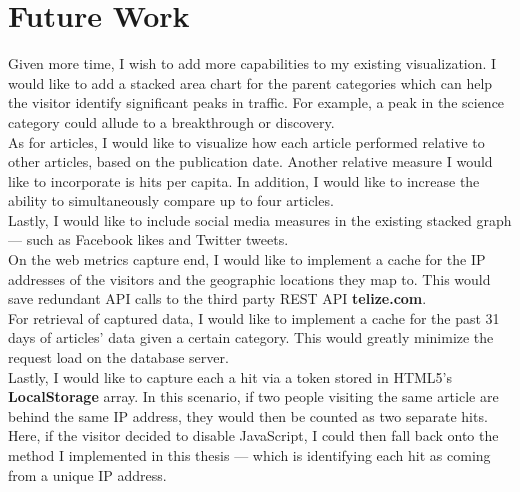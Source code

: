 \documentclass[12pt]{article}
\begin{document}
{\section{Future Work}
Given more time, I wish to add more capabilities to my existing visualization. I would like to add a stacked area chart for the parent categories which can help the visitor identify significant peaks in traffic. For example, a peak in the science category could allude to a breakthrough or discovery. \\
As for articles, I would like to visualize how each article performed relative to other articles, based on the publication date. Another relative measure I would like to incorporate is hits per capita. In addition, I would like to increase the ability to simultaneously compare up to four articles. \\
Lastly, I would like to include social media measures in the existing stacked graph --- such as Facebook likes and Twitter tweets.
\\On the web metrics capture end, I would like to implement a cache for the IP addresses of the visitors and the geographic locations they map to. This would save redundant API calls to the third party REST API  \textbf{telize.com}. 
\\For retrieval of captured data, I would like to implement a cache for the past 31 days of articles' data given a certain category. This would greatly minimize the request load on the database server.
\\Lastly, I would like to capture each a hit via a token stored in HTML5's \textbf{LocalStorage} array. In this scenario, if two people visiting the same article are behind the same IP address, they would then be counted as two separate hits. Here, if the visitor decided to disable JavaScript, I could then fall back onto the method I implemented in this thesis --- which is identifying each hit as coming from a unique IP address.

\newpage

}
\end{document}
